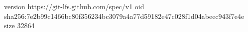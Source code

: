 version https://git-lfs.github.com/spec/v1
oid sha256:7e2b99c1466bc80f356234bc3079a4a77d59182e47c028f1d04abeec943f7e4e
size 32864
